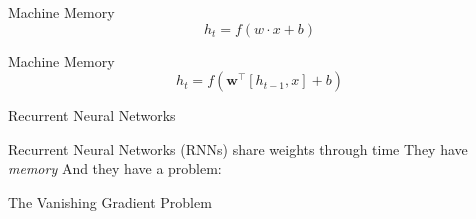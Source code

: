 \begin{slide}{Machine Memory}
  $$h_t = f(w \cdot x + b)$$
\end{slide}

\begin{slide}{Machine Memory}
  $$h_t = f(\mathbf{w}^\top [h_{t-1}, x] + b)$$
\end{slide}

\begin{slide}{Recurrent Neural Networks}
  \begin{itemize}
    \pitem Recurrent Neural Networks (RNNs) share weights through time
    \pitem They have \emph{memory}
    \pitem And they have a problem:
  \end{itemize}
  \vspace{1cm}
  {
    \Large
    The Vanishing Gradient Problem
  }
\end{slide}

